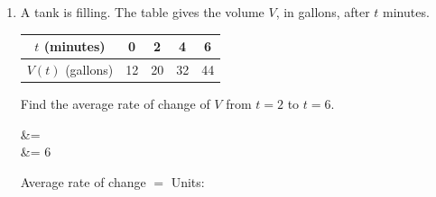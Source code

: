 \documentclass[10pt]{article}
\begin{document}
\begin{enumerate}[itemsep=10pt]
\item A tank is filling. The table gives the volume $V$, in gallons, after
      $t$ minutes.

\smallskip
\renewcommand{\arraystretch}{1.4}
\begin{center}
\begin{tabular}{|c|c|c|c|c|}
\hline
$t$ (minutes) & 0 & 2 & 4 & 6 \\
\hline
$V(t)$ (gallons) & 12 & 20 & 32 & 44 \\
\hline
\end{tabular}
\end{center}

\smallskip
Find the average rate of change of $V$ from $t = 2$ to $t = 6$.

\begin{work}
   &=  \\
                            &= 6
\end{work}

Average rate of change $= $  \qquad Units: 

\end{enumerate}
\end{document}
